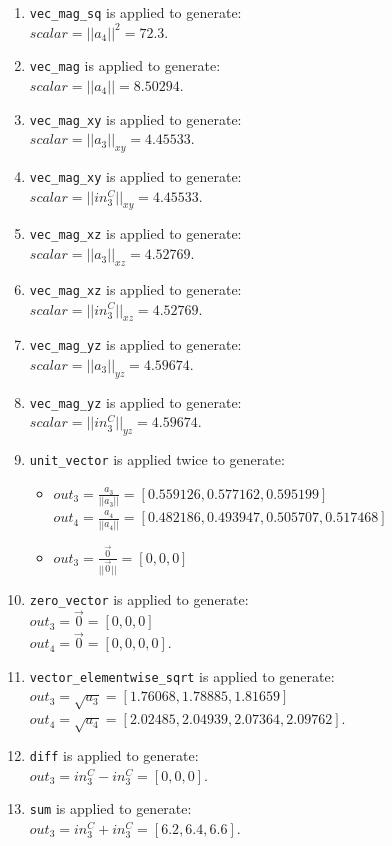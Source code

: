 \documentclass[11pt,fleqn]{report}
\begin{document}
\begin{enumerate}
\begin{itemize}
            \item $out_3 = in^C_3 \times in^C_3 = [0, 0, 0]$ 
        \end{itemize}
    \item \texttt{vec\_mag\_sq} is applied to generate: \\
        $ scalar = ||a_4||^2 = 72.3$.
    \item \texttt{vec\_mag} is applied to generate: \\
        $ scalar = ||a_4|| = 8.50294$.
    \item \texttt{vec\_mag\_xy} is applied to generate: \\
        $ scalar = ||a_3||_{xy} = 4.45533$.
    \item \texttt{vec\_mag\_xy} is applied to generate: \\
        $ scalar = ||in^C_3||_{xy} = 4.45533$.
    \item \texttt{vec\_mag\_xz} is applied to generate: \\
        $ scalar = ||a_3||_{xz} = 4.52769$.
    \item \texttt{vec\_mag\_xz} is applied to generate: \\
        $ scalar = ||in^C_3||_{xz} = 4.52769$.
    \item \texttt{vec\_mag\_yz} is applied to generate: \\
        $ scalar = ||a_3||_{yz} = 4.59674$.
    \item \texttt{vec\_mag\_yz} is applied to generate: \\
        $ scalar = ||in^C_3||_{yz} = 4.59674$.
    \item \texttt{unit\_vector} is applied twice to generate:
        \begin{itemize}        
            \item $ out_3 = \frac{a_3}{||a_3||} = [0.559126, 0.577162, 0.595199]$ \\
                  $ out_4 = \frac{a_4}{||a_4||} = [0.482186, 0.493947, 0.505707, 0.517468]$
            \item $ out_3 = \frac{\vec{0}}{||\vec{0}||} = [0, 0, 0]$
        \end{itemize}
    \item \texttt{zero\_vector} is applied to generate: \\
        $ out_3 = \vec{0} = [0, 0, 0]$ \\
        $ out_4 = \vec{0} = [0, 0, 0, 0]$.
    \item \texttt{vector\_elementwise\_sqrt} is applied to generate: \\
        $ out_3 = \sqrt{a_3} = [1.76068, 1.78885, 1.81659]$ \\
        $ out_4 = \sqrt{a_4} = [2.02485, 2.04939, 2.07364, 2.09762]$.
    \item \texttt{diff} is applied to generate: \\
        $ out_3 = in^C_3 - in^C_3 = [0, 0, 0]$.
    \item \texttt{sum} is applied to generate: \\
        $ out_3 = in^C_3 + in^C_3 = [6.2, 6.4, 6.6]$.
\end{enumerate}
\end{document}
